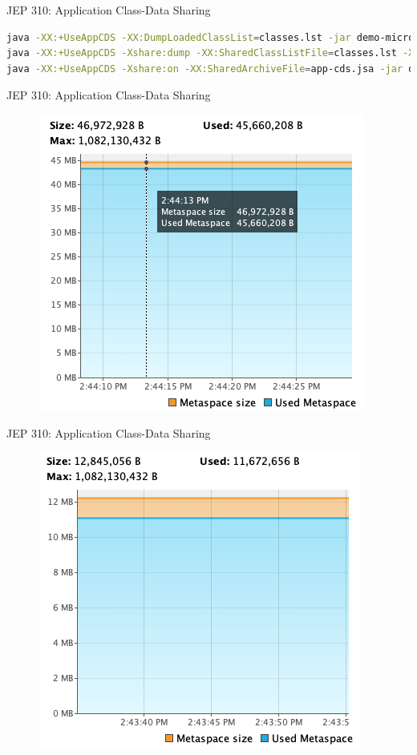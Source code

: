 \documentclass[aspectratio=169]{beamer}
\begin{document}
\begin{frame}[fragile]{JEP 310: Application Class-Data Sharing}
\begin{lstlisting}[language=bash,basicstyle=\scriptsize]
java -XX:+UseAppCDS -XX:DumpLoadedClassList=classes.lst -jar demo-microservicio-ee-microbundle.jar
java -XX:+UseAppCDS -Xshare:dump -XX:SharedClassListFile=classes.lst -XX:SharedArchiveFile=app-cds.jsa demo-microservicio-ee-microbundle.jar
java -XX:+UseAppCDS -Xshare:on -XX:SharedArchiveFile=app-cds.jsa -jar demo-microservicio-ee-microbundle.jar
\end{lstlisting}	
\end{frame}
\begin{frame}[fragile]{JEP 310: Application Class-Data Sharing}
    \begin{figure}
        \centering
        \includegraphics[width=0.7\linewidth]{Images/nocdsmem}
    \end{figure}
\end{frame}
\begin{frame}[fragile]{JEP 310: Application Class-Data Sharing}
    \begin{figure}
        \centering
        \includegraphics[width=0.7\linewidth]{Images/cdsmem}
    \end{figure}
\end{frame}
\end{document}
